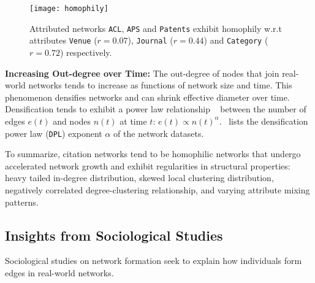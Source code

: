 
\begin{figure}
 \centering
 \texttt{[image: homophily]}
 \caption{
    Attributed networks \texttt{ACL}, \texttt{APS} and \texttt{Patents} exhibit
    homophily w.r.t attributes \texttt{Venue} ($r=0.07$), \texttt{Journal} ($r=0.44$) and
    \texttt{Category} ($r=0.72$) respectively.
 }
 \label{fig:mixing}
 \vspace{-20pt}
\end{figure}

\textbf{Increasing Out-degree over Time:}
The out-degree of nodes that join real-world networks tends to increase as
functions of network size and time. This phenomenon densifies networks and
can shrink effective diameter over time. Densification tends to exhibit a power law
relationship ~\cite{leskovec2005graphs} between the number of edges $e(t)$ and
nodes $n(t)$ at time $t$: $e(t) \propto n(t)^{\alpha}$.~
lists the densification power law (\texttt{DPL}) exponent $\alpha$ of the
network datasets.

To summarize, citation networks tend to be homophilic networks that undergo
accelerated network growth and exhibit regularities in structural properties:
heavy tailed in-degree distribution, skewed local clustering distribution,
negatively correlated degree-clustering relationship, and varying attribute
mixing patterns.



\subsection{Insights from Sociological Studies}

Sociological studies on network formation seek to explain
how individuals form edges in real-world networks.

